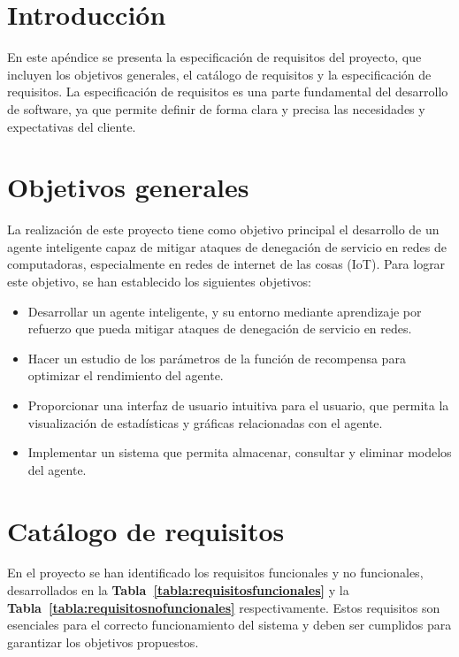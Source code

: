
\section{Introducción}

En este apéndice se presenta la especificación de requisitos del proyecto, que incluyen los objetivos generales, el catálogo de requisitos y la especificación de requisitos. La especificación de requisitos es una parte fundamental del desarrollo de software, ya que permite definir de forma clara y precisa las necesidades y expectativas del cliente.


\section{Objetivos generales}
La realización de este proyecto tiene como objetivo principal el desarrollo de un agente inteligente capaz de mitigar ataques de denegación de servicio en redes de computadoras, especialmente en redes de internet de las cosas (IoT). 
Para lograr este objetivo, se han establecido los siguientes objetivos:
\begin{itemize}
	\item Desarrollar un agente inteligente, y su entorno mediante aprendizaje por refuerzo que pueda mitigar ataques de denegación de servicio en redes.
	\item Hacer un estudio de los parámetros de la función de recompensa para optimizar el rendimiento del agente.
	\item Proporcionar una interfaz de usuario intuitiva para el usuario, que permita la visualización de estadísticas y gráficas relacionadas con el agente.
	\item Implementar un sistema que permita almacenar, consultar y eliminar modelos del agente.
\end{itemize}

\section{Catálogo de requisitos}
En el proyecto se han identificado los requisitos funcionales y no funcionales, desarrollados en la \textbf{Tabla~\ref{tabla:requisitosfuncionales}} y la \textbf{Tabla~\ref{tabla:requisitosnofuncionales}} respectivamente. Estos requisitos son esenciales para el correcto funcionamiento del sistema y deben ser cumplidos para garantizar los objetivos propuestos.

